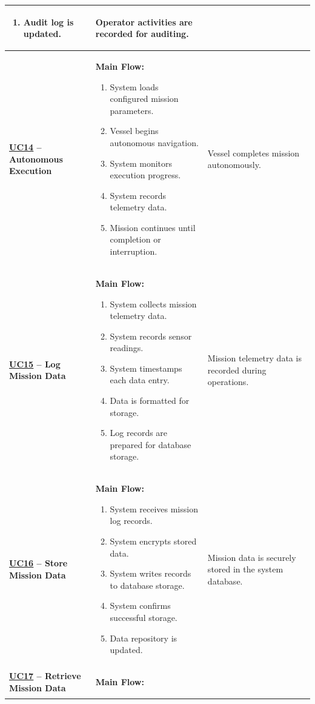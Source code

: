 \documentclass[11pt,a4paper]{article}
\let\orighyperref\hyperref
\renewcommand{\hyperref}[2][]{\orighyperref[#1]{\uline{#2}}}%
\begin{document}
\begin{longtable}{|>{\raggedright\arraybackslash}p{}|>{\raggedright\arraybackslash}p{}|>{\raggedright\arraybackslash}p{}|}
\begin{enumerate}[leftmargin=*,nosep]
  \item Audit log is updated.
\end{enumerate} & Operator activities are recorded for auditing. \\
\hline
\textbf{\hyperref[fig:usecase-diagram-pdf]{UC14} -- Autonomous Execution} & \textbf{Main Flow:}\begin{enumerate}[leftmargin=*,nosep]
  \item System loads configured mission parameters.
  \item Vessel begins autonomous navigation.
  \item System monitors execution progress.
  \item System records telemetry data.
  \item Mission continues until completion or interruption.
\end{enumerate} & Vessel completes mission autonomously. \\
\hline
\textbf{\hyperref[fig:usecase-diagram-pdf]{UC15} -- Log Mission Data} & \textbf{Main Flow:}\begin{enumerate}[leftmargin=*,nosep]
  \item System collects mission telemetry data.
  \item System records sensor readings.
  \item System timestamps each data entry.
  \item Data is formatted for storage.
  \item Log records are prepared for database storage.
\end{enumerate} & Mission telemetry data is recorded during operations. \\
\hline
\textbf{\hyperref[fig:usecase-diagram-pdf]{UC16} -- Store Mission Data} & \textbf{Main Flow:}\begin{enumerate}[leftmargin=*,nosep]
  \item System receives mission log records.
  \item System encrypts stored data.
  \item System writes records to database storage.
  \item System confirms successful storage.
  \item Data repository is updated.
\end{enumerate} & Mission data is securely stored in the system database. \\
\hline
\textbf{\hyperref[fig:usecase-diagram-pdf]{UC17} -- Retrieve Mission Data} & \textbf{Main Flow:}\begin{enumerate}[leftmargin=*,nosep]

\end{enumerate}
\end{longtable}
\end{document}
